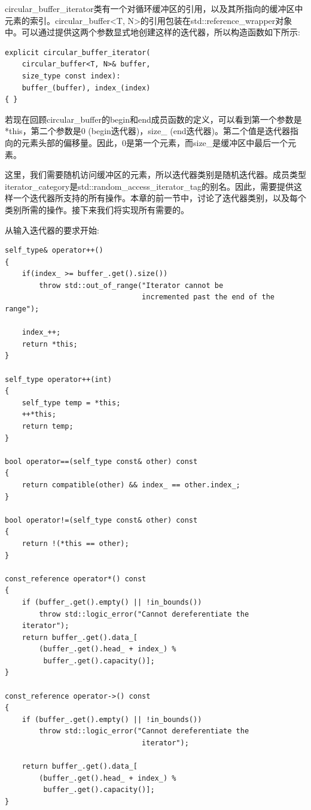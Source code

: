 circular\_buffer\_iterator类有一个对循环缓冲区的引用，以及其所指向的缓冲区中元素的索引。circular\_buffer<T, N>的引用包装在std::reference\_wrapper对象中。可以通过提供这两个参数显式地创建这样的迭代器，所以构造函数如下所示:

\begin{lstlisting}[style=styleCXX]
explicit circular_buffer_iterator(
	circular_buffer<T, N>& buffer,
	size_type const index):
	buffer_(buffer), index_(index)
{ }
\end{lstlisting}

若现在回顾circular\_buffer的begin和end成员函数的定义，可以看到第一个参数是*this，第二个参数是0 (begin迭代器)，size\_ (end迭代器)。第二个值是迭代器指向的元素头部的偏移量。因此，0是第一个元素，而size\_是缓冲区中最后一个元素。

这里，我们需要随机访问缓冲区的元素，所以迭代器类别是随机迭代器。成员类型iterator\_category是std::random\_access\_iterator\_tag的别名。因此，需要提供这样一个迭代器所支持的所有操作。本章的前一节中，讨论了迭代器类别，以及每个类别所需的操作。接下来我们将实现所有需要的。

从输入迭代器的要求开始:

\begin{lstlisting}[style=styleCXX]
self_type& operator++()
{
	if(index_ >= buffer_.get().size())
		throw std::out_of_range("Iterator cannot be
								incremented past the end of the range");
								
	index_++;
	return *this;
}

self_type operator++(int)
{
	self_type temp = *this;
	++*this;
	return temp;
}

bool operator==(self_type const& other) const
{
	return compatible(other) && index_ == other.index_;
}

bool operator!=(self_type const& other) const
{
	return !(*this == other);
}

const_reference operator*() const
{
	if (buffer_.get().empty() || !in_bounds())
		throw std::logic_error("Cannot dereferentiate the
	iterator");
	return buffer_.get().data_[
		(buffer_.get().head_ + index_) %
		 buffer_.get().capacity()];
}

const_reference operator->() const
{
	if (buffer_.get().empty() || !in_bounds())
		throw std::logic_error("Cannot dereferentiate the
								iterator");
								
	return buffer_.get().data_[
		(buffer_.get().head_ + index_) %
		 buffer_.get().capacity()];
}
\end{lstlisting}

